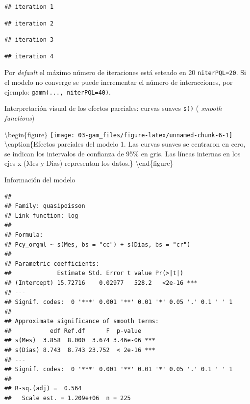 \documentclass[
]{book}
\newenvironment{Shaded}{\begin{snugshade}}{\end{snugshade}}
\newcommand{\AttributeTok}[1]{\textcolor[rgb]{0.77,0.63,0.00}{#1}}
\newcommand{\DecValTok}[1]{\textcolor[rgb]{0.00,0.00,0.81}{#1}}
\newcommand{\FunctionTok}[1]{\textcolor[rgb]{0.00,0.00,0.00}{#1}}
\newcommand{\NormalTok}[1]{#1}
\newcommand{\SpecialCharTok}[1]{\textcolor[rgb]{0.00,0.00,0.00}{#1}}
\begin{document}
\begin{verbatim}
## iteration 1
\end{verbatim}

\begin{verbatim}
## iteration 2
\end{verbatim}

\begin{verbatim}
## iteration 3
\end{verbatim}

\begin{verbatim}
## iteration 4
\end{verbatim}

Por \emph{default} el máximo número de iteraciones está seteado en 20 \texttt{niterPQL=20}. Si el modelo no converge se puede incrementar el número de interacciones, por ejemplo: \texttt{gamm(...,\ niterPQL=40)}.

Interpretación visual de los efectos parciales: curvas suaves \texttt{s()} ( \emph{smooth functions})

\begin{Shaded}
\end{Shaded}

\textbackslash begin\{figure\}
\texttt{[image: 03-gam\_files/figure-latex/unnamed-chunk-6-1]} \textbackslash caption\{Efectos parciales del modelo 1. Las curvas suaves se centraron en cero, se indican los intervalos de confianza de 95\% en gris. Las líneas internas en los ejes x (Mes y Dias) representan los datos.\}\label{fig:unnamed-chunk-6}
\textbackslash end\{figure\}

Información del modelo

\begin{Shaded}
\end{Shaded}

\begin{verbatim}
## 
## Family: quasipoisson 
## Link function: log 
## 
## Formula:
## Pcy_orgml ~ s(Mes, bs = "cc") + s(Dias, bs = "cr")
## 
## Parametric coefficients:
##             Estimate Std. Error t value Pr(>|t|)    
## (Intercept) 15.72716    0.02977   528.2   <2e-16 ***
## ---
## Signif. codes:  0 '***' 0.001 '**' 0.01 '*' 0.05 '.' 0.1 ' ' 1
## 
## Approximate significance of smooth terms:
##           edf Ref.df      F  p-value    
## s(Mes)  3.858  8.000  3.674 3.46e-06 ***
## s(Dias) 8.743  8.743 23.752  < 2e-16 ***
## ---
## Signif. codes:  0 '***' 0.001 '**' 0.01 '*' 0.05 '.' 0.1 ' ' 1
## 
## R-sq.(adj) =  0.564   
##   Scale est. = 1.209e+06  n = 225
\end{verbatim}
\end{document}
